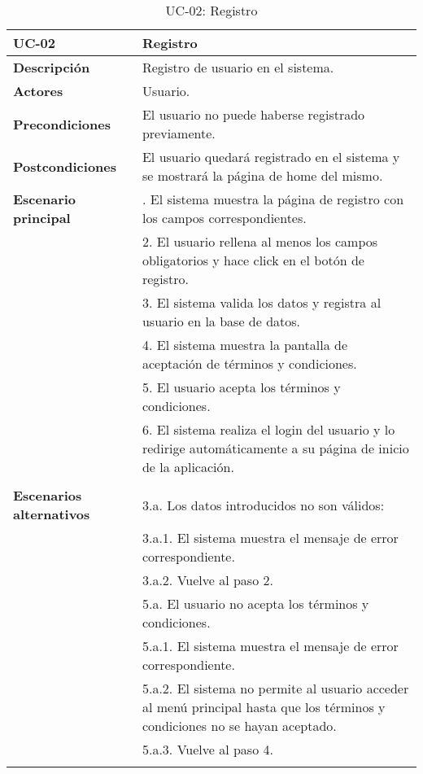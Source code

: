 \begin{table}[H]
  \begin{center}
    \begin{tabularx}{16.4cm}{|l|X|}
      \hline
      \textbf{UC-02} & \textbf{Registro}\\
      \hline
      \textbf{Descripción} & Registro de usuario en el sistema.\\
      \hline
      \textbf{Actores} & Usuario.\\
      \hline
      \textbf{Precondiciones} & El usuario no puede haberse registrado previamente.\\
      \hline
      \textbf{Postcondiciones} & El usuario quedará registrado en el sistema y se mostrará la página de home del mismo.\\
      \hline
      \textbf{Escenario principal} & \smallskip 1. El sistema muestra la página de registro con los campos correspondientes.\\
      & 2. El usuario rellena al menos los campos obligatorios y hace click en el botón de registro.\\
      & 3. El sistema valida los datos y registra al usuario en la base de datos.\\
      & 4. El sistema muestra la pantalla de aceptación de términos y condiciones.\\
      & 5. El usuario acepta los términos y condiciones.\\
      & 6. El sistema realiza el login del usuario y lo redirige automáticamente a su página de inicio de la aplicación.\\
      & \\
      \hline
      \textbf{Escenarios alternativos} & \smallskip 3.a. Los datos introducidos no son válidos:\\
      & \hspace{0.3cm} 3.a.1. El sistema muestra el mensaje de error correspondiente.\\
      & \hspace{0.3cm} 3.a.2. Vuelve al paso 2.\\
      & 5.a. El usuario no acepta los términos y condiciones.\\
      & \hspace{0.3cm} 5.a.1. El sistema muestra el mensaje de error correspondiente.\\
      & \hspace{0.3cm} 5.a.2. El sistema no permite al usuario acceder al menú principal hasta que los términos y condiciones no se hayan aceptado.\\
      & \hspace{0.3cm} 5.a.3. Vuelve al paso 4.\\
      & \\
      \hline
    \end{tabularx}
    \caption{UC-02: Registro}
  \end{center}
\end{table}


